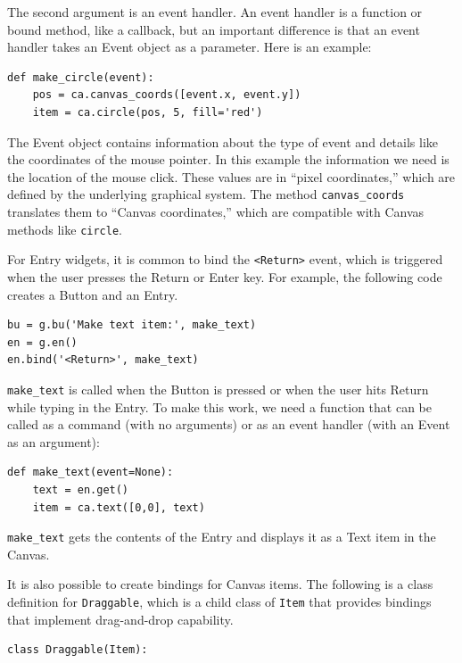 \documentclass[10pt]{book}
\begin{document}
{

The second argument is an event handler.  An event handler
is a function or bound method, like a callback, but an important
difference is that an event handler takes an Event object as a
parameter.  Here is an example:

\beforeverb
\begin{verbatim}
def make_circle(event):
    pos = ca.canvas_coords([event.x, event.y])
    item = ca.circle(pos, 5, fill='red')
\end{verbatim}
\afterverb
%
The Event object contains information about the type of event and
details like the coordinates of the mouse pointer.  In this example
the information we need is
the location of the mouse click.  These
values are in ``pixel coordinates,'' which are defined by the
underlying graphical system.  The method \verb"canvas_coords"
translates them to ``Canvas coordinates,'' which are compatible with
Canvas methods like {\tt circle}.


For Entry widgets, it is common to bind the \verb"<Return>" event,
which is triggered when the user presses the {\sf Return} or
{\sf Enter} key.  For example, the following code creates a Button
and an Entry.

\beforeverb
\begin{verbatim}
bu = g.bu('Make text item:', make_text)
en = g.en()
en.bind('<Return>', make_text)
\end{verbatim}
\afterverb
%
\verb"make_text" is called when the Button is pressed or when
the user hits {\sf Return} while typing in the Entry.  To make
this work, we need a function that can be called as a command
(with no arguments) or as an event handler (with an Event
as an argument):

\beforeverb
\begin{verbatim}
def make_text(event=None):
    text = en.get()
    item = ca.text([0,0], text)
\end{verbatim}
\afterverb
%
\verb"make_text" gets the contents of the Entry and displays
it as a Text item in the Canvas.

It is also possible to create bindings for Canvas items.
The following is a class definition for {\tt Draggable},
which is a child class of {\tt Item} that provides bindings
that implement drag-and-drop capability.


\beforeverb
\begin{verbatim}
class Draggable(Item):


\end{verbatim}}
\end{document}
